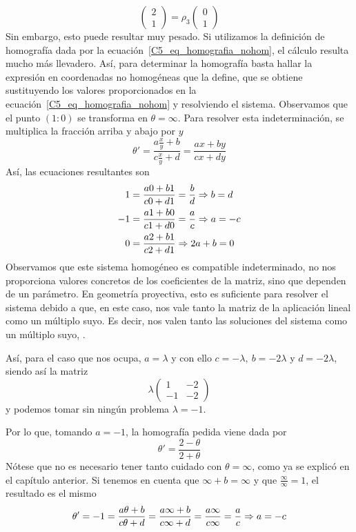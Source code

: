 \begin{exa}
\begin{equation*}
		\left( \begin{array}{c}
			2\\ 1
		\end{array}\right)=\rho_3
		\left( \begin{array}{c}
			0\\ 1
		\end{array}\right)
	\end{equation*}
	Sin embargo, esto puede resultar muy pesado. Si utilizamos la definición de homografía dada por la ecuación~\eqref{C5_eq_homografia_nohom}, el cálculo resulta mucho más llevadero. Así, para determinar la homografía basta hallar la expresión en coordenadas no homogéneas que la define, que se obtiene sustituyendo los valores proporcionados en la ecuación~\eqref{C5_eq_homografia_nohom} y resolviendo el sistema. Observamos que el punto $(1:0)$ se transforma en $\theta=\infty$. Para resolver esta indeterminación, se multiplica la fracción arriba y abajo por $y$
	\begin{equation}
		\theta'=\frac{a\frac{x}{y}+b}{c\frac{x}{y}+d}=\frac{ax+by}{cx +dy}
	\end{equation}
	Así, las ecuaciones resultantes son
	\begin{equation*}
		\begin{split}
			1&=\frac{a0+b1}{c0 +d1}=\frac{b}{d}\Rightarrow b=d\\
			-1&=\frac{a1+b0}{c1 +d0}=\frac{a}{c}\Rightarrow a=-c\\
			0&=\frac{a2+b1}{c2 +d1}\Rightarrow 2a+b=0
		\end{split}
	\end{equation*}
	Observamos que este sistema homogéneo es compatible indeterminado, no nos proporciona valores concretos de los coeficientes de la matriz, sino que dependen de un parámetro. En geometría proyectiva, esto es suficiente para resolver el sistema debido a que, en este caso, nos vale tanto la matriz de la aplicación lineal como un múltiplo suyo. Es decir, nos valen tanto las soluciones del sistema como un múltiplo suyo, .
	
	Así, para el caso que nos ocupa, $a=\lambda$ y con ello $c=-\lambda, \ b=-2\lambda$ y $d=-2\lambda$, siendo así la matriz
	\begin{equation*}
	 \lambda \left( \begin{array}{cc}
	 1&-2\\ -1&-2
	 \end{array}\right) 
	\end{equation*}
	y podemos tomar sin ningún problema $\lambda=-1$.
	
	Por lo que, tomando $a=-1$, la homografía pedida viene dada por
	\begin{equation*}
		\theta'=\frac{2-\theta}{2+\theta}
	\end{equation*}
	Nótese que no es necesario tener tanto cuidado con $\theta=\infty$, como ya se explicó en el capítulo anterior. Si tenemos en cuenta que $\infty+b=\infty$ y que $\frac{\infty}{\infty}=1$, el resultado es el mismo
	\begin{equation*}
		\theta'=-1=\frac{a\theta+b}{c\theta +d}=\frac{a\infty+b}{c\infty +d}=\frac{a\infty}{c\infty}=\frac{a}{c}\Rightarrow a=-c
	\end{equation*}
\end{exa}
